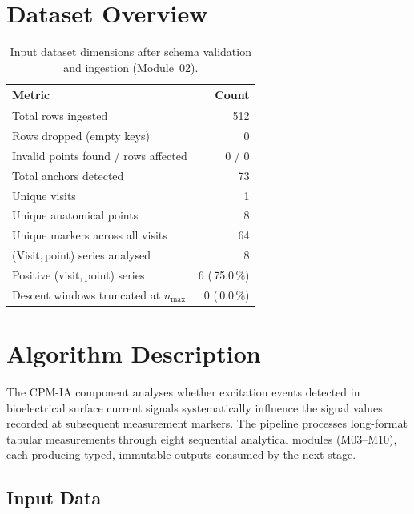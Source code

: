 \documentclass[a4paper,11pt]{article}
\begin{document}
\section{Dataset Overview}

\begin{table}[h!]
\centering
\small
\caption{Input dataset dimensions after schema validation and ingestion (Module~02).}
\begin{tabular}{lr}
\toprule
\textbf{Metric} & \textbf{Count} \\
\midrule
Total rows ingested                        & 512 \\
Rows dropped (empty keys)                  & 0 \\
Invalid points found / rows affected       & 0 / 0 \\
Total anchors detected                     & 73 \\
Unique visits                          & 1 \\
Unique anatomical points               & 8 \\
Unique markers across all visits       & 64 \\
(Visit,\,point) series analysed        & 8 \\
Positive (visit,\,point) series        & 6 (\,75.0\,\%) \\
Descent windows truncated at $n_{\max}$ & 0 (\,0.0\,\%) \\
\bottomrule
\end{tabular}
\end{table}

\section{Algorithm Description}

The CPM-IA component analyses whether excitation events detected in bioelectrical surface
current signals systematically influence the signal values recorded at subsequent measurement
markers. The pipeline processes long-format tabular measurements through eight sequential
analytical modules (M03--M10), each producing typed, immutable outputs consumed by the next
stage.

\subsection{Input Data}
\end{document}
